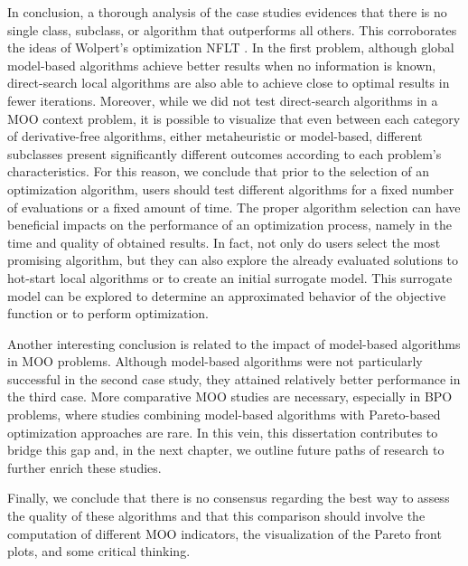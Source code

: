 In conclusion, a thorough analysis of the case studies evidences that there is no single class, subclass, or algorithm that outperforms all others. This corroborates the ideas of Wolpert's optimization \ac{NFLT} \cite{Wolpert1997NFLT}. In the first problem, although global model-based algorithms achieve better results when no information is known, direct-search local algorithms are also able to achieve close to optimal results in fewer iterations. Moreover, while we did not test direct-search algorithms in a \ac{MOO} context problem, it is possible to visualize that even between each category of derivative-free algorithms, either metaheuristic or model-based, different subclasses present significantly different outcomes according to each problem's characteristics. For this reason, we conclude that prior to the selection of an optimization algorithm, users should test different algorithms for a fixed number of evaluations or a fixed amount of time. The proper algorithm selection can have beneficial impacts on the performance of an optimization process, namely in the time and quality of obtained results. In fact, not only do users select the most promising algorithm, but they can also explore the already evaluated solutions to hot-start local algorithms or to create an initial surrogate model. This surrogate model can be explored to determine an approximated behavior of the objective function or to perform optimization. 

Another interesting conclusion is related to the impact of model-based algorithms in \ac{MOO} problems. Although model-based algorithms were not particularly successful in the second case study, they attained relatively better performance in the third case. More comparative \ac{MOO} studies are necessary, especially in \ac{BPO} problems, where studies combining model-based algorithms with Pareto-based optimization approaches are rare. In this vein, this dissertation contributes to bridge this gap and, in the next chapter, we outline future paths of research to further enrich these studies.

Finally, we conclude that there is no consensus regarding the best way to assess the quality of these algorithms and that this comparison should involve the computation of different \ac{MOO} indicators, the visualization of the Pareto front plots, and some critical thinking. 